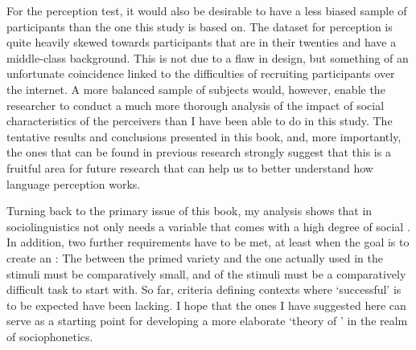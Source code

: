 For the perception test, it would also be desirable to have a less biased sample of participants than the one this study is based on.
The dataset for perception is quite heavily skewed towards participants that are in their twenties and have a middle-class background.
This is not due to a flaw in design, but something of an unfortunate coincidence linked to the difficulties of recruiting participants over the internet.
A more balanced sample of subjects would, however, enable the researcher to conduct a much more thorough analysis of the impact of social characteristics of the perceivers than I have been able to do in this study.
The tentative results and conclusions presented in this book, and, more importantly, the ones that can be found in previous research \parencite[cf.][]{hayetal2006a,haydrager2010} strongly suggest that this is a fruitful area for future research that can help us to better understand how language perception works.

Turning back to the primary issue of this book, my analysis shows that   in sociolinguistics not only needs a variable that comes with a high degree of social .
In addition, two further requirements have to be met, at least when the goal is to create an : 
The  between the primed variety and the one actually used in the stimuli must be comparatively small, and  of the stimuli must be a comparatively difficult task to start with.
So far, criteria defining contexts where `successful'   is to be expected have been lacking.
I hope that the ones I have suggested here can serve as a starting point for developing a more elaborate `theory of ' \parencite[cf.][]{cesario2014} in the realm of sociophonetics.